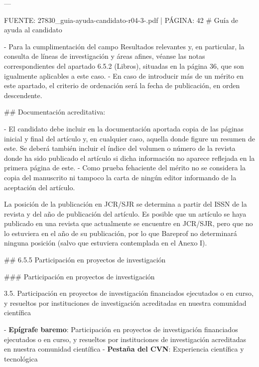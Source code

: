 \documentclass{article}
\begin{document}
\begin{itemize}
\begin{itemize}
\begin{scriptsize}
                  ---

                  FUENTE: 27830\_guia-ayuda-candidato-r04-3-.pdf | PÁGINA: 42
                  \# Guía de ayuda al candidato

                  - Para la cumplimentación del campo Resultados relevantes y, en particular, la consulta de líneas de investigación y áreas afines, véanse las notas correspondientes del apartado 6.5.2 (Libros), situadas en la página 36, que son igualmente aplicables a este caso.
                  - En caso de introducir más de un mérito en este apartado, el criterio de ordenación será la fecha de publicación, en orden descendente.

                  \#\# Documentación acreditativa:

                  - El candidato debe incluir en la documentación aportada copia de las páginas inicial y final del artículo y, en cualquier caso, aquella donde figure un resumen de este. Se deberá también incluir el índice del volumen o número de la revista donde ha sido publicado el artículo si dicha información no aparece reflejada en la primera página de este.
                  - Como prueba fehaciente del mérito no se considera la copia del manuscrito ni tampoco la carta de ningún editor informando de la aceptación del artículo.

                  La posición de la publicación en JCR/SJR se determina a partir del ISSN de la revista y del año de publicación del artículo. Es posible que un artículo se haya publicado en una revista que actualmente se encuentre en JCR/SJR, pero que no lo estuviera en el año de su publicación, por lo que Bareprof no determinará ninguna posición (salvo que estuviera contemplada en el Anexo I).

                  \#\# 6.5.5 Participación en proyectos de investigación

                  \#\#\# Participación en proyectos de investigación

                  3.5. Participación en proyectos de investigación financiados ejecutados o en curso, y resueltos por instituciones de investigación acreditadas en nuestra comunidad científica

                  - \textbf{Epígrafe baremo}: Participación en proyectos de investigación financiados ejecutados o en curso, y resueltos por instituciones de investigación acreditadas en nuestra comunidad científica
                  - \textbf{Pestaña del CVN}: Experiencia científica y tecnológica


\end{scriptsize}
\end{itemize}
\end{itemize}
\end{document}

